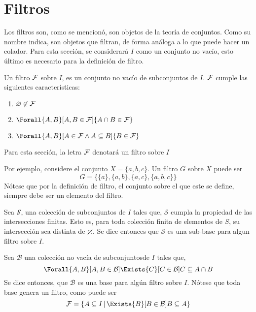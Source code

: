 \section{Filtros}

Los filtros son, como se mencionó, son objetos de la teoría de conjuntos.
Como su nombre indica, son objetos que filtran, de forma análoga a lo que
puede hacer un colador. Para esta sección, se considerará $I$ como un
conjunto no vacío, esto último es necesario para la definición de filtro.

\begin{definition}\label{def:filtro}
  Un filtro $\mathcal{F}$ sobre $I$, es un conjunto no vacío de subconjuntos de $I$.
  $\mathcal{F}$ cumple las siguientes características:
  \begin{enumerate}
    \item $\varnothing \not\in \mathcal{F}$
    \item $\Forall{A,B}[A,B \in \F]{A\cap B \in \F}$
    \item $\Forall{A,B}[A\in \F \land A \subseteq B]{B \in \F}$
  \end{enumerate}

  Para esta sección, la letra $\mathcal{F}$ denotará un filtro sobre $I$
\end{definition}

Por ejemplo, considere el conjunto $X=\{a,b,c\}$. Un filtro $G$ sobre $X$
puede ser 
\[G = \{\{a\}, \{a,b\}, \{a,c\}, \{a,b,c\}\}\]
Nótese que por la definición de filtro, el conjunto sobre el que este se
define, siempre debe ser un elemento del filtro.

\begin{definition}
  Sea $\mathcal{S}$, una colección de subconjuntos de $I$ tales que,
  $\mathcal{S}$ cumpla la propiedad de las intersecciones finitas. Esto es,
  para toda colección finita de elementos de $S$, su intersección sea
  distinta de $\varnothing$. Se dice entonces que $\mathcal{S}$ es una
  sub-base para algun filtro sobre $I$.
\end{definition}

\begin{definition}
  Sea $\mathcal{B}$ una colección no vacía de subconjuntosde $I$ tales
  que,
  \[
    \Forall{A,B}[A,B \in \mathcal{B}]{
      \Exists{C}[C\in\mathcal{B}]{C \subseteq A \cap B}
      }
  \]
  Se dice entonces, que $\mathcal{B}$ es una base para algún filtro sobre $I$.
  Nótese que toda base genera un filtro, como puede ser
  \[\F = \{A \subseteq I \,|\, \Exists{B}[B\in\mathcal{B}]{B\subseteq A}\}\]
\end{definition}

